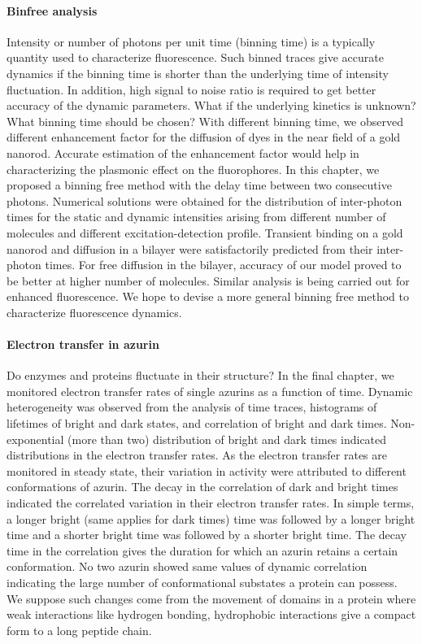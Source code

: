 \paragraph*{Binfree analysis}
Intensity or number of photons per unit time (binning time) is a typically quantity used to characterize fluorescence. Such binned traces give accurate dynamics if the binning time is shorter than the underlying time of intensity fluctuation. In addition, high signal to noise ratio is required to get better accuracy of the dynamic parameters. What if the underlying kinetics is unknown? What binning time should be chosen? With different binning time, we observed different enhancement factor for the diffusion of dyes in the near field of a gold nanorod. Accurate estimation of the enhancement factor would help in characterizing the plasmonic effect on the fluorophores. In this chapter, we proposed a binning free method with the delay time between two consecutive photons. Numerical solutions were obtained for the distribution of inter-photon times for the static and dynamic intensities arising from different number of molecules and different excitation-detection profile. Transient binding on a gold nanorod and diffusion in a bilayer were satisfactorily predicted from their inter-photon times. For free diffusion in the bilayer, accuracy of our model proved to be better at higher number of molecules. Similar analysis is being carried out for enhanced fluorescence. We hope to devise a more general binning free method to characterize fluorescence dynamics.

\paragraph*{Electron transfer in azurin}
Do enzymes and proteins fluctuate in their structure? In the final chapter, we monitored electron transfer rates of single azurins as a function of time. Dynamic heterogeneity was observed from the analysis of time traces, histograms of lifetimes of bright and dark states, and correlation of bright and dark times. Non-exponential (more than two) distribution of bright and dark times indicated distributions in the electron transfer rates. As the electron transfer rates are monitored in steady state, their variation in activity were attributed to different conformations of azurin. The decay in the correlation of dark and bright times indicated the correlated variation in their electron transfer rates. In simple terms, a longer bright (same applies for dark times) time was followed by a longer bright time and a shorter bright time was followed by a shorter bright time. The decay time in the correlation gives the duration for which an azurin retains a certain conformation. No two azurin showed same values of dynamic correlation indicating the large number of conformational substates a protein can possess. We suppose such changes come from the movement of domains in a protein where weak interactions like hydrogen bonding, hydrophobic interactions give a compact form to a long peptide chain. 

